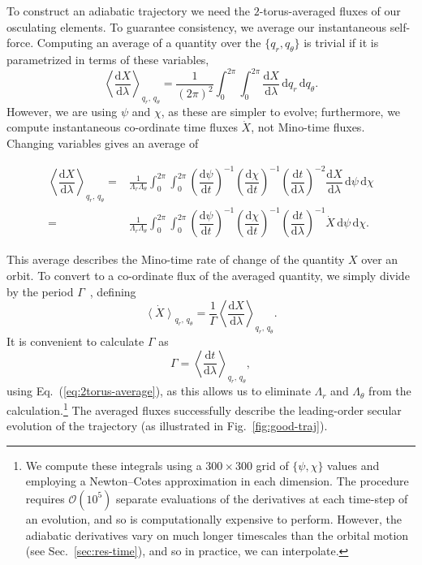 \documentclass[aps,prd,amsfonts,amssymb,amsmath,nofootinbib,showpacs,superscriptaddress,twocolumn,floatfix]{revtex4-1}
\newcommand{\eqnref}[1]{Eq.~(\ref{eq:#1})}
\newcommand{\figref}[1]{Fig.~\ref{fig:#1}}
\newcommand{\secref}[1]{Sec.~\ref{sec:#1}}
\newcommand{\dd}{\ensuremath{\mathrm{d}}}
\newcommand{\diff}[2]{\ensuremath{\dfrac{\dd {#1}}{\dd {#2}}}}
\newcommand{\intd}[4]{\ensuremath{\int_{#1}^{#2}{#3}\,\dd{#4}}}
\begin{document}
To construct an adiabatic trajectory we need the $2$-torus-averaged fluxes of our osculating elements. To guarantee consistency, we average our instantaneous self-force. Computing an average of a quantity over the $\{q_r, q_\theta\}$ is trivial if it is parametrized in terms of these variables,
\begin{equation}
\left\langle \diff{X}{\lambda}\right\rangle_{q_r,\,q_\theta} = \frac{1}{(2\pi)^2}\intd{0}{2\pi}{\intd{0}{2\pi}{\diff{X}{\lambda}}{q_r}}{q_\theta}.
\end{equation}
However, we are using $\psi$ and $\chi$, as these are simpler to evolve; furthermore, we compute instantaneous co-ordinate time fluxes $\dot{X}$, not Mino-time fluxes. Changing variables gives an average of \cite{Drasco2005}
\begin{widetext}\begin{align}
\left\langle \diff{X}{\lambda}\right\rangle_{q_r,\,q_\theta} = {} & \frac{1}{\Lambda_r \Lambda_\theta}\intd{0}{2\pi}{\intd{0}{2\pi}{\left(\diff{\psi}{t}\right)^{-1} \left(\diff{\chi}{t}\right)^{-1} \left(\diff{t}{\lambda}\right)^{-2} \diff{X}{\lambda}}{\psi}}{\chi} \\
 = {} & \frac{1}{\Lambda_r \Lambda_\theta}\intd{0}{2\pi}{\intd{0}{2\pi}{\left(\diff{\psi}{t}\right)^{-1} \left(\diff{\chi}{t}\right)^{-1} \left(\diff{t}{\lambda}\right)^{-1} \dot{X}}{\psi}}{\chi}.
\label{eq:2torus-average}
\end{align}\end{widetext}
This average describes the Mino-time rate of change of the quantity $X$ over an orbit. To convert to a co-ordinate flux of the averaged quantity, we simply divide by the period $\Gamma$~\cite{Flanagan2012a}, defining
\begin{equation}
\dot{\left\langle X\right\rangle}_{q_r,\,q_\theta} = \frac{1}{\Gamma}\left\langle \diff{X}{\lambda}\right\rangle_{q_r,\,q_\theta}.
\end{equation}
It is convenient to calculate $\Gamma$ as
\begin{equation}
\Gamma = \left\langle \diff{t}{\lambda}\right\rangle_{q_r,\,q_\theta},
\end{equation}
using \eqnref{2torus-average}, as this allows us to eliminate $\Lambda_r$ and $\Lambda_\theta$ from the calculation.\footnote{We compute these integrals using a $300\times 300$ grid of $\{\psi,\chi\}$ values and employing a Newton--Cotes approximation in each dimension. The procedure requires $\mathcal{O}(10^5)$ separate evaluations of the derivatives at each time-step of an evolution, and so is computationally expensive to perform. However, the adiabatic derivatives vary on much longer timescales than the orbital motion (see \secref{res-time}), and so in practice, we can interpolate.}
The averaged fluxes successfully describe the leading-order secular evolution of the trajectory (as illustrated in \figref{good-traj}).
\end{document}
